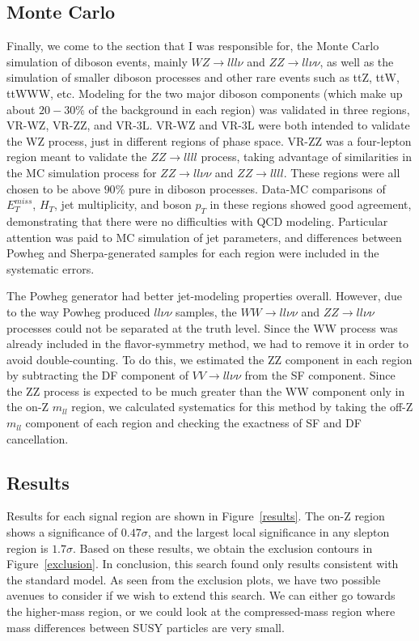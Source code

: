 \subsection*{Monte Carlo}

Finally, we come to the section that I was responsible for, the Monte Carlo simulation of diboson events, mainly $WZ\rightarrow lll\nu$ and $ZZ\rightarrow ll\nu\nu$, as well as the simulation of smaller diboson processes and other rare events such as ttZ, ttW, ttWWW, etc. Modeling for the two major diboson components (which make up about $20-30\%$ of the background in each region) was validated in three regions, VR-WZ, VR-ZZ, and VR-3L. VR-WZ and VR-3L were both intended to validate the WZ process, just in different regions of phase space. VR-ZZ was a four-lepton region meant to validate the $ZZ\rightarrow llll$ process, taking advantage of similarities in the MC simulation process for $ZZ\rightarrow ll\nu\nu$ and $ZZ\rightarrow llll$. These regions were all chosen to be above $90\%$ pure in diboson processes. Data-MC comparisons of $E_T^{miss}$, $H_T$, jet multiplicity, and boson $p_T$ in these regions showed good agreement, demonstrating that there were no difficulties with QCD modeling. Particular attention was paid to MC simulation of jet parameters, and differences between Powheg and Sherpa-generated samples for each region were included in the systematic errors.

The Powheg generator had better jet-modeling properties overall. However, due to the way Powheg produced $ll\nu\nu$ samples, the $WW\rightarrow ll\nu\nu$ and $ZZ\rightarrow ll\nu\nu$ processes could not be separated at the truth level. Since the WW process was already included in the flavor-symmetry method, we had to remove it in order to avoid double-counting. To do this, we estimated the ZZ component in each region by subtracting the DF component of $VV\rightarrow ll\nu\nu$ from the SF component. Since the ZZ process is expected to be much greater than the WW component only in the on-Z $m_{ll}$ region, we calculated systematics for this method by taking the off-Z $m_{ll}$ component of each region and checking the exactness of SF and DF cancellation.

\subsection*{Results}

Results for each signal region are shown in Figure~\ref{results}. The on-Z region shows a significance of $0.47\sigma$, and the largest local significance in any slepton region is $1.7\sigma$. Based on these results, we obtain the exclusion contours in Figure~\ref{exclusion}. In conclusion, this search found only results consistent with the standard model. As seen from the exclusion plots, we have two possible avenues to consider if we wish to extend this search. We can either go towards the higher-mass region, or we could look at the compressed-mass region where mass differences between SUSY particles are very small.

